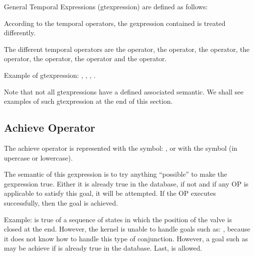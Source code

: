 General Temporal Expressions (gtexpression) are defined as follows:

\noindent
{} \*
 \*
 \*
\*
\*
\*

According to the temporal operators, the gexpression contained is treated
differently.

The different temporal operators are the  operator, the 
operator, the  operator, the  operator, the
 operator, the  operator and the
 operator.

Example of gtexpression:\*
,\*
,\*
,\*
.

Note that not all gtexpressions have a defined associated semantic. We
shall see examples of such gtexpression at the end of this section.



\subsection{Achieve Operator}

The achieve operator is represented with the symbol: \samp{!}, or with the
symbol  (in upercase or lowercase).

The semantic of this gexpression is to try anything ``possible'' to make the
gexpression true. Either it is already true in the database, if not and if any
OP is applicable to satisfy this goal, it will be attempted. If the OP executes
successfully, then the goal is achieved.

Example:  is true of a sequence of states in
which the position of the valve is closed at the end. However, the kernel is
unable to handle goals such as: , because it does not know how to handle this type of
conjunction. However, a goal such as  may be achieve if  is already true in the database. Last,  is allowed.

